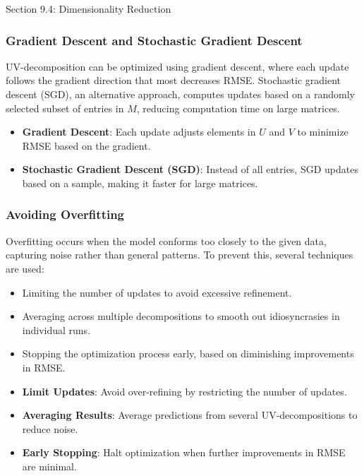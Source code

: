 \begin{notes}{Section 9.4: Dimensionality Reduction}
    \subsubsection*{Gradient Descent and Stochastic Gradient Descent}
    
    UV-decomposition can be optimized using gradient descent, where each update follows the gradient direction that most decreases RMSE. Stochastic gradient descent (SGD), an alternative approach, 
    computes updates based on a randomly selected subset of entries in $M$, reducing computation time on large matrices.
    
    \begin{highlight}
        \begin{itemize}
            \item \textbf{Gradient Descent}: Each update adjusts elements in $U$ and $V$ to minimize RMSE based on the gradient.
            \item \textbf{Stochastic Gradient Descent (SGD)}: Instead of all entries, SGD updates based on a sample, making it faster for large matrices.
        \end{itemize}
    \end{highlight}
    
    \subsubsection*{Avoiding Overfitting}
    
    Overfitting occurs when the model conforms too closely to the given data, capturing noise rather than general patterns. To prevent this, several techniques are used:
    \begin{itemize}
        \item Limiting the number of updates to avoid excessive refinement.
        \item Averaging across multiple decompositions to smooth out idiosyncrasies in individual runs.
        \item Stopping the optimization process early, based on diminishing improvements in RMSE.
    \end{itemize}
    
    \begin{highlight}
        \begin{itemize}
            \item \textbf{Limit Updates}: Avoid over-refining by restricting the number of updates.
            \item \textbf{Averaging Results}: Average predictions from several UV-decompositions to reduce noise.
            \item \textbf{Early Stopping}: Halt optimization when further improvements in RMSE are minimal.
        \end{itemize}
    \end{highlight}
    

\end{notes}
